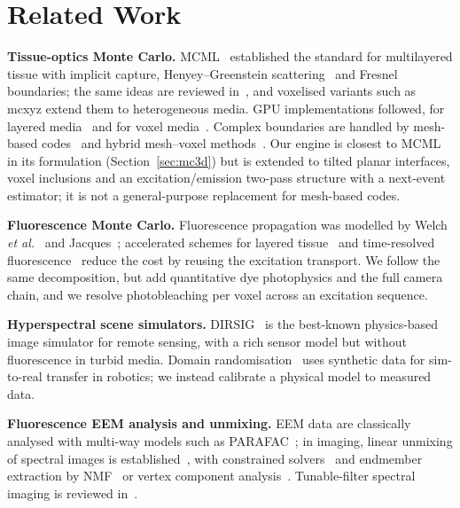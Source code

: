 \documentclass[journal]{IEEEtran}
\begin{document}
\section{Related Work}
\label{sec:related}
\textbf{Tissue-optics Monte Carlo.} MCML~\cite{wang1995mcml} established the standard for multilayered tissue with implicit capture, Henyey--Greenstein scattering~\cite{henyey1941} and Fresnel boundaries; the same ideas are reviewed in~\cite{jacques2011mc,jacques2008tutorial}, and voxelised variants such as mcxyz extend them to heterogeneous media. GPU implementations followed, for layered media~\cite{alerstam2008} and for voxel media~\cite{fang2009mcx}. Complex boundaries are handled by mesh-based codes~\cite{boas2002,fang2010mmc,shen2010timos,leino2019valomc} and hybrid mesh--voxel methods~\cite{yan2020hybrid}. Our engine is closest to MCML in its formulation (Section~\ref{sec:mc3d}) but is extended to tilted planar interfaces, voxel inclusions and an excitation/emission two-pass structure with a next-event estimator; it is not a general-purpose replacement for mesh-based codes.

\textbf{Fluorescence Monte Carlo.} Fluorescence propagation was modelled by Welch \emph{et al.}~\cite{welch1997} and Jacques~\cite{jacques2003fluor}; accelerated schemes for layered tissue~\cite{swartling2003} and time-resolved fluorescence~\cite{liebert2008} reduce the cost by reusing the excitation transport. We follow the same decomposition, but add quantitative dye photophysics and the full camera chain, and we resolve photobleaching per voxel across an excitation sequence.

\textbf{Hyperspectral scene simulators.} DIRSIG~\cite{goodenough2017dirsig} is the best-known physics-based image simulator for remote sensing, with a rich sensor model but without fluorescence in turbid media. Domain randomisation~\cite{tobin2017} uses synthetic data for sim-to-real transfer in robotics; we instead calibrate a physical model to measured data.

\textbf{Fluorescence EEM analysis and unmixing.} EEM data are classically analysed with multi-way models such as PARAFAC~\cite{bro1997,murphy2013}; in imaging, linear unmixing of spectral images is established~\cite{zimmermann2005,keshava2002,bioucas2012}, with constrained solvers~\cite{heinz2001,lawson1995} and endmember extraction by NMF~\cite{lee1999} or vertex component analysis~\cite{nascimento2005}. Tunable-filter spectral imaging is reviewed in~\cite{morris1994lctf,lu2014,valm2017}.
\end{document}

